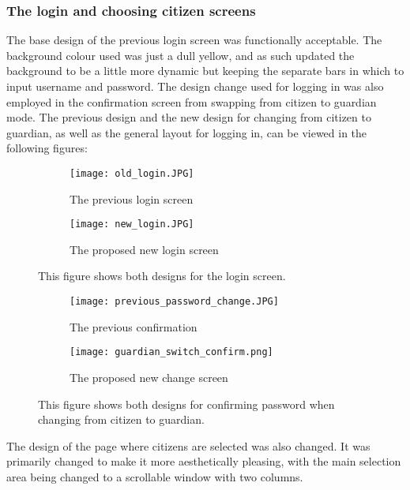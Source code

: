 \subsubsection{The login and choosing citizen screens}
The base design of the previous login screen was functionally acceptable. 
The background colour used was just a dull yellow, and as such updated the background to be a little more dynamic but keeping the separate bars in which to input username and password.
The design change used for logging in was also employed in the confirmation screen from swapping from citizen to guardian mode. 
The previous design and the new design for changing from citizen to guardian, as well as the general layout for logging in, can be viewed in the following figures:
\begin{figure}[H]
    \begin{subfigure}{0.5\textwidth}
    \texttt{[image: old\_login.JPG]} 
    \caption{The previous login screen}
    \label{fig:previous_login}
    \end{subfigure}
    \begin{subfigure}{0.5\textwidth}
        \texttt{[image: new\_login.JPG]}
    \caption{The proposed new login screen}
    \label{fig:new_login}
    \end{subfigure} 
    \caption{This figure shows both designs for the login screen.}
    \label{fig:guardian_confirm}
\end{figure}
\noindent
\begin{figure}[H]
    \begin{subfigure}{0.5\textwidth}
    \texttt{[image: previous\_password\_change.JPG]} 
    \caption{The previous confirmation}
    \label{fig:previous_guardian_confirm}
    \end{subfigure}
    \begin{subfigure}{0.5\textwidth}
        \texttt{[image: guardian\_switch\_confirm.png]}
    \caption{The proposed new change screen}
    \label{fig:new_guardian_confirm}
    \end{subfigure} 
    \caption{This figure shows both designs for confirming password when changing from citizen to guardian.}
    \label{fig:guardian_confirm}
\end{figure}
\noindent
The design of the page where citizens are selected was also changed.
It was  primarily changed to make it more aesthetically pleasing, with the main selection area being changed to a scrollable window with two columns. 
